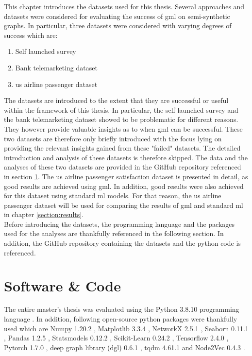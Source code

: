   
  This chapter introduces the datasets used for this thesis. Several approaches
  and datasets were considered for evaluating the success of \acs{gml} on 
  semi-synthetic graphs. In particular, three datasets were considered with 
  varying degrees of success which are:

  \begin{enumerate}
    \item Self launched survey
    \item Bank telemarketing dataset
    \item \acs{us} airline passenger dataset
  \end{enumerate}

  \noindent The datasets are introduced to the extent that they are successful 
  or useful within the framework of this thesis. In particular, the self 
  launched survey and the bank telemarketing dataset showed to be problematic 
  for different reasons. They however provide valuable insights as to when 
  \acs{gml} can be successful. These two datasets are therefore only briefly 
  introduced with the focus lying on providing the relevant insights gained 
  from these "failed" datasets. The detailed introduction and analysis of these 
  datasets is therefore skipped. The data and the analyses of these two datasets 
  are provided in the GitHub repository referenced in section 
  \ref{section:software}. The \acs{us} airline passenger satisfaction dataset 
  is presented in detail, as good results are achieved using \acs{gml}. In
  addition, good results were also achieved for this dataset using standard
  \acs{ml} models. For that reason, the \acs{us} airline passenger dataset will
  be used for comparing the results of \acs{gml} and standard \acs{ml} in
  chapter \ref{section:results}. \\

  \noindent Before introducing the datasets, the programming language and the
   packages used for the analyses are thankfully referenced in the following 
   section. In addition, the GitHub repository containing the datasets and the 
   python code is referenced.

  \section{Software \& Code}
  \label{section:software}

  The entire master's thesis was evaluated using the Python 3.8.10 programming
  language \citep{vanRossum2009}. In addition, following open-source python
  packages were thankfully used which are Numpy 1.20.2 \citep{harris2020array},
  Matplotlib 3.3.4 \citep{Hunter2007}, NetworkX 2.5.1 \citep{hagberg2008exploring}, 
  Seaborn 0.11.1 \citep{Waskom2021}, Pandas 1.2.5 \citep{mckinney2010data}, 
  Statsmodels 0.12.2 \citep{seabold2010statsmodels}, Scikit-Learn 0.24.2 
  \citep{pedregosa2011scikit}, Tensorflow 2.4.0 \citep{abadi2016tensorflow}, 
  Pytorch 1.7.0 \citep{paszke2019pytorch}, deep graph library (dgl) 0.6.1 
  \citep{wang2019deep}, tqdm 4.61.1 \citep{da2021tqdm} and Node2Vec 0.4.3 
  \citep{Cohen2021}. \\

